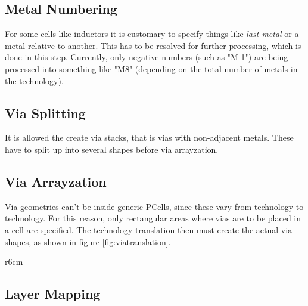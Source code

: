 \documentclass{scrartcl}
\begin{document}
\subsection{Metal Numbering}
For some cells like inductors it is customary to specify things like \emph{last metal} or a metal relative to another. This has to be resolved for further
processing, which is done in this step. Currently, only negative numbers (such as "M-1") are being processed into something like "M8" (depending on the total number
of metals in the technology).
\subsection{Via Splitting}
It is allowed the create via stacks, that is vias with non-adjacent metals. These have to split up into several shapes before via arrayzation.
\subsection{Via Arrayzation}
Via geometries can't be inside generic PCells, since these vary from technology to technology. For this reason, only rectangular areas where vias are to be placed in
a cell are specified. The technology translation then must create the actual via shapes, as shown in figure \ref{fig:viatranslation}.
\begin{wrapfigure}{r}{6cm}
    \centering
    \caption{Example of via arrayzation}
    \label{fig:viatranslation}
\end{wrapfigure}
\subsection{Layer Mapping}
\end{document}
